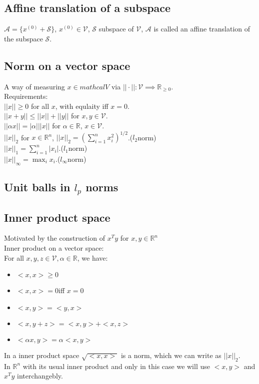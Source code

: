 \documentclass[twoside]{article}
\begin{document}
\subsection{Affine translation of a subspace}
$\mathcal{A}=\{x^{(0)}+\mathcal{S}\}$, $x^{(0)} \in \mathcal{V}$, $\mathcal{S}$ subspace of $\mathcal{V}$,
$\mathcal{A}$ is called an affine translation of the subspace $\mathcal{S}$.

\subsection{Norm on a vector space}
A way of measuring $x \in mathcal{V}$ via $||\cdot||: \mathcal{V}\implies \mathbb{R}_{\ge 0}$.\\
Requirements:\\
$||x||\ge 0$ for all $x$, with equlaity iff $x=0$.\\
$||x+y||\le ||x||+||y||$ for $x,y\in \mathcal{V}$.\\
$||\alpha x||=|\alpha|||x||$ for $\alpha \in \mathbb{R}$, $x\in\mathcal{V}$.\\
$||x||_2$ for $x \in \mathbb{R}^n$, $||x||_2=(\sum_{i=1}^{n}{x_i^2})^{1/2}$.($l_2$norm)\\
$||x||_1=\sum_{i=1}^{n}{|x_i|}$.($l_1$norm)\\
$||x||_{\infty}=\max_{i}{x_i}$.($l_{\infty}$norm)

\subsection{Unit balls in $l_p$ norms}

\subsection{Inner product space}
Motivated by the construction of $x^Ty$ for $x,y\in \mathbb{R}^n$\\
Inner product on a vector space:\\
For all $x,y,z \in \mathcal{V}, \alpha \in \mathbb{R}$, we have:\\
\begin{itemize}
\item $<x,x> \ge 0$
\item $<x,x>=0$iff $x=0$
\item $<x,y>=<y,x>$
\item $<x,y+z>=<x,y>+<x,z>$
\item $<\alpha x,y>=\alpha<x,y>$
\end{itemize}
In a inner product space $\sqrt{<x,x>}$ is a norm, which we can write as $||x||_2$.\\
In $\mathbb{R}^n$ with its usual inner product and only in this case we will use $<x,y> $ and $x^Ty$ interchangebly. 
\end{document}
